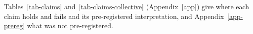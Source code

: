 Tables~\ref{tab-claims} and~\ref{tab-claims-collective} (Appendix~\ref{app}) give where each claim holds
and fails and its pre-registered interpretation, and Appendix~\ref{app-prereg} what
was not pre-registered.
